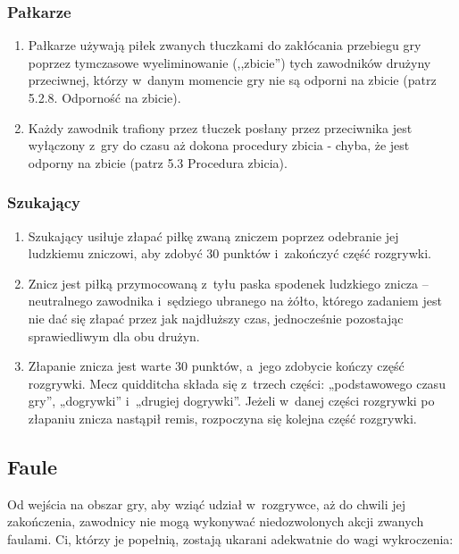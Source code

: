 \documentclass[12pt,a4paper]{article}
\begin{document}
\subsubsection{Pałkarze}
\begin{enumerate}
	\item Pałkarze używają piłek zwanych tłuczkami do zakłócania przebiegu gry
	      poprzez tymczasowe wyeliminowanie (,,zbicie'') tych zawodników drużyny
	      przeciwnej, którzy w~danym momencie gry nie są odporni na zbicie (patrz
	      5.2.8. Odporność na zbicie).

	\item Każdy zawodnik trafiony przez tłuczek posłany przez przeciwnika jest
	      wyłączony z~gry do czasu aż dokona procedury zbicia - chyba, że jest
	      odporny na zbicie (patrz 5.3 Procedura zbicia).
\end{enumerate}

\subsubsection{Szukający}
\begin{enumerate}
	\item Szukający usiłuje złapać piłkę zwaną zniczem poprzez odebranie jej
	      ludzkiemu zniczowi, aby zdobyć 30 punktów i~zakończyć część rozgrywki.

	\item Znicz jest piłką przymocowaną z~tyłu paska spodenek ludzkiego znicza
	      -- neutralnego zawodnika i~sędziego ubranego na żółto,
	      którego zadaniem jest nie dać się złapać przez jak najdłuższy czas,
	      jednocześnie pozostając sprawiedliwym dla obu drużyn.

	\item Złapanie znicza jest warte 30 punktów, a~jego zdobycie kończy część
	      rozgrywki. Mecz quidditcha składa się z~trzech części: „podstawowego
	      czasu gry'', „dogrywki'' i~„drugiej dogrywki''. Jeżeli w~danej części
	      rozgrywki po złapaniu znicza nastąpił remis, rozpoczyna się kolejna
	      część rozgrywki.
\end{enumerate}

\subsection{Faule}
Od wejścia na obszar gry, aby wziąć udział w~rozgrywce, aż do chwili jej zakończenia, zawodnicy nie mogą wykonywać niedozwolonych akcji zwanych faulami. Ci, którzy je popełnią, zostają ukarani adekwatnie do wagi wykroczenia: 
\end{document}
